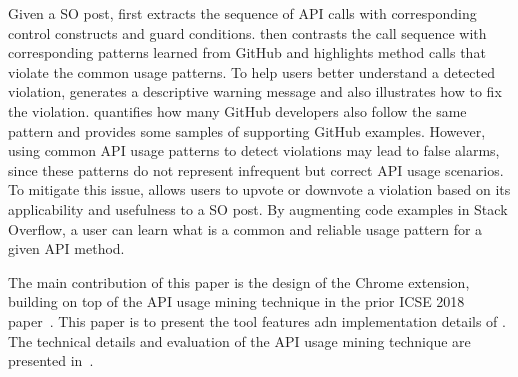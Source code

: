 Given a SO post, {\tool} first extracts the sequence of API calls with corresponding control constructs and guard conditions. {\tool} then contrasts the call sequence with corresponding patterns learned from GitHub and highlights method calls that violate the common usage patterns. To help users better understand a detected violation, {\tool} generates a descriptive warning message and also illustrates how to fix the violation. {\tool} quantifies how many GitHub developers also follow the same pattern and provides some samples of supporting GitHub examples. However, using common API usage patterns to detect violations may lead to false alarms, since these patterns do not represent infrequent but correct API usage scenarios. To mitigate this issue, {\tool} allows users to upvote or downvote a violation based on its applicability and usefulness to a SO post. By augmenting code examples in Stack Overflow, a user can learn what is a common and reliable usage pattern for a given API method.

The main contribution of this paper is the design of the Chrome extension, building on top of the API usage mining technique in the prior ICSE 2018 paper~\cite{zhang2018code}. This paper is to present the tool features adn implementation details of {\tool}. The technical details and evaluation of the API usage mining technique are presented in~\cite{zhang2018code}.



%
